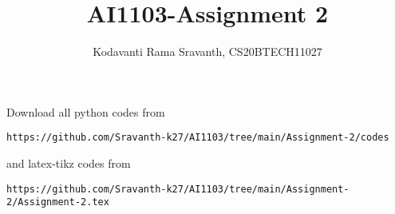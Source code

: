 \documentclass[journal,12pt,twocolumn]{IEEEtran}
\DeclareMathOperator*{\Res}{Res}
\begin{document}
\newcommand{\BEQA}{\begin{eqnarray}}
\newcommand{\EEQA}{\end{eqnarray}}
\newcommand{\define}{\stackrel{\triangle}{=}}

\raggedbottom
\setlength{\parindent}{0pt}
\providecommand{\mbf}{\mathbf}
\providecommand{\pr}[1]{\ensuremath{\Pr\left(#1\right)}}
\providecommand{\qfunc}[1]{\ensuremath{Q\left(#1\right)}}
\providecommand{\sbrak}[1]{\ensuremath{{}\left[#1\right]}}
\providecommand{\lsbrak}[1]{\ensuremath{{}\left[#1\right.}}
\providecommand{\rsbrak}[1]{\ensuremath{{}\left.#1\right]}}
\providecommand{\brak}[1]{\ensuremath{\left(#1\right)}}
\providecommand{\lbrak}[1]{\ensuremath{\left(#1\right.}}
\providecommand{\rbrak}[1]{\ensuremath{\left.#1\right)}}
\providecommand{\cbrak}[1]{\ensuremath{\left\{#1\right\}}}
\providecommand{\lcbrak}[1]{\ensuremath{\left\{#1\right.}}
\providecommand{\rcbrak}[1]{\ensuremath{\left.#1\right\}}}
\theoremstyle{remark}
\newtheorem{rem}{Remark}
\newcommand{\sgn}{\mathop{\mathrm{sgn}}}
\providecommand{\abs}[1]{\vert#1\vert}
\providecommand{\res}[1]{\Res\displaylimits_{#1}} 
\providecommand{\norm}[1]{\lVert#1\rVert}
\providecommand{\mtx}[1]{\mathbf{#1}}
\providecommand{\mean}[1]{E[ #1 ]}
\providecommand{\fourier}{\overset{\mathcal{F}}{ \rightleftharpoons}}
\providecommand{\system}{\overset{\mathcal{H}}{ \longleftrightarrow}}
\newcommand{\solution}{\noindent \textbf{Solution: }}
\newcommand{\cosec}{\,\text{cosec}\,}
\providecommand{\dec}[2]{\ensuremath{\overset{#1}{\underset{#2}{\gtrless}}}}
\newcommand{\myvec}[1]{\ensuremath{\begin{pmatrix}#1\end{pmatrix}}}
\newcommand{\mydet}[1]{\ensuremath{\begin{vmatrix}#1\end{vmatrix}}}
\makeatletter
{}
\makeatother
\let\StandardTheFigure\thefigure
\let\vec\mathbf
\renewcommand{\thefigure}{\theproblem}
\def\putbox#1#2#3{\makebox[0in][l]{\makebox[#1][l]{}\raisebox{\baselineskip}[0in][0in]{\raisebox{#2}[0in][0in]{#3}}}}
     \def\rightbox#1{\makebox[0in][r]{#1}}
     \def\centbox#1{\makebox[0in]{#1}}
     \def\topbox#1{\raisebox{-\baselineskip}[0in][0in]{#1}}
     \def\midbox#1{\raisebox{-0.5\baselineskip}[0in][0in]{#1}}
\vspace{3cm}
\title{AI1103-Assignment 2}
\author{Kodavanti Rama Sravanth, CS20BTECH11027}
\maketitle
\newpage
\bigskip
\renewcommand{\thefigure}{\theenumi}
\renewcommand{\thetable}{\theenumi}
Download all python codes from 
\begin{lstlisting}
https://github.com/Sravanth-k27/AI1103/tree/main/Assignment-2/codes
\end{lstlisting}
%
and latex-tikz codes from 
%
\begin{lstlisting}
https://github.com/Sravanth-k27/AI1103/tree/main/Assignment-2/Assignment-2.tex
\end{lstlisting}
\end{document}
